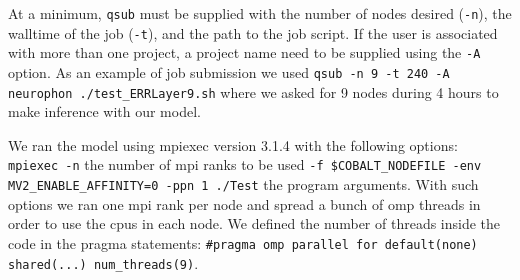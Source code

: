 \documentclass[10pt,journal,compsoc]{IEEEtran}
\begin{document}
At a minimum, \texttt{qsub} must be supplied with the number of nodes desired (\texttt{-n}), the walltime of the job (\texttt{-t}), and the path to the job script.  If the user is associated with more than one project, a project name need to be supplied using the \texttt{-A} option. As an example of job submission we used \texttt{qsub -n 9 -t 240 -A neurophon ./test\_ERRLayer9.sh} where we asked for 9 nodes during 4 hours to make inference with our model.

We ran the model using mpiexec version 3.1.4 with the following options: \texttt{mpiexec -n} the number of \gls{mpi} ranks to be used \texttt{-f \$COBALT\_NODEFILE -env MV2\_ENABLE\_AFFINITY=0 -ppn 1 ./Test} the program arguments. With such options we ran one \gls{mpi} rank per node and spread a bunch of \gls{omp} threads in order to use the \glspl{cpu} in each node. We defined the number of threads inside the code in the pragma statements: \texttt{\#pragma omp parallel for default(none) shared(...) num\_threads(9)}.
















\end{document}
